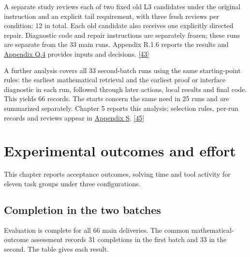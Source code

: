 A separate study reviews each of two fixed old L3 candidates under the original instruction and an explicit tail requirement, with three fresh reviews per condition: 12 in total. Each old candidate also receives one explicitly directed repair. Diagnostic code and repair instructions are separately frozen; these runs are separate from the 33 main runs. Appendix R.1.6 reports the results and \href{en-appendix.pdf\#q4}{Appendix Q.4} provides inputs and decisions. \hyperlink{ref-43}{\mbox{[43]}}

A further analysis covers all 33 second-batch runs using the same starting-point rules: the earliest mathematical retrieval and the earliest proof or interface diagnostic in each run, followed through later actions, local results and final code. This yields 66 records. The starts concern the same need in 25 runs and are summarized separately. Chapter 5 reports this analysis; selection rules, per-run records and reviews appear in \href{en-appendix.pdf\#appendix-s}{Appendix S}. \hyperlink{ref-45}{\mbox{[45]}}

\section[Experimental outcomes and effort]{\texorpdfstring{\protect\hypertarget{section-3}{}Experimental outcomes and effort}{Experimental outcomes and effort}}
This chapter reports acceptance outcomes, solving time and tool activity for eleven task groups under three configurations.

\subsection[Completion in the two batches]{\texorpdfstring{\protect\hypertarget{section-3-1}{}Completion in the two batches}{Completion in the two batches}}
Evaluation is complete for all 66 main deliveries. The common mathematical-outcome assessment records 31 completions in the first batch and 33 in the second. The table gives each result.

